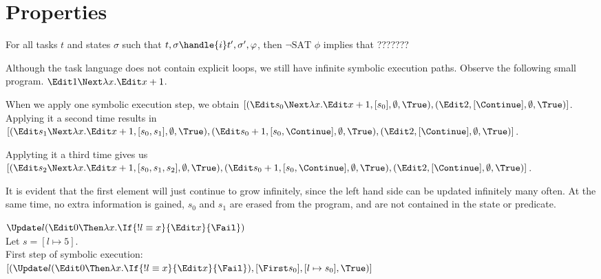 


\section{Properties}
\label{sec:properties}


\begin{lemma}
For all tasks $t$ and states $\sigma$ such that $t,\sigma \handle{i} t',\sigma',\phi $,
then $\neg\text{SAT }\phi$ implies that ???????
\label{lemma:notSat}
\end{lemma}


Although the task language does not contain explicit loops, we still have infinite symbolic execution paths. Observe the following small program. $\Edit 1 \Next \lambda x . \Edit x + 1$.

When we apply one symbolic execution step, we obtain $[(\Edit s_0\Next \lambda x. \Edit x+1,[s_0],\emptyset,\True),(\Edit 2,[\Continue],\emptyset,\True)]$.
Applying it a second time results in
$[(\Edit s_1\Next \lambda x. \Edit x+1,[s_0,s_1],\emptyset,\True)
 ,(\Edit s_0+1,[s_0,\Continue],\emptyset,\True)
 ,(\Edit 2,[\Continue],\emptyset,\True)]$.

 Applyting it a third time gives us
 $[(\Edit s_2\Next \lambda x. \Edit x+1,[s_0,s_1,s_2],\emptyset,\True)
  ,(\Edit s_0+1,[s_0,\Continue],\emptyset,\True)
  ,(\Edit 2,[\Continue],\emptyset,\True)]$.

It is evident that the first element will just continue to grow infinitely, since the left hand side can be updated infinitely many often. At the same time, no extra information is gained, $s_0$ and $s_1$ are erased from the program, and are not contained in the state or
predicate.




$\Update l \And (\Edit 0 \Then \lambda x . \If{!l\equiv x}{\Edit x}{\Fail})$\\
Let $s=[l\mapsto 5]$.\\

First step of symbolic execution:\\
$[(\Update l \And (\Edit 0 \Then \lambda x . \If{!l\equiv x}{\Edit x}{\Fail}),[\First s_0],[l\mapsto s_0],\True)]$\\


